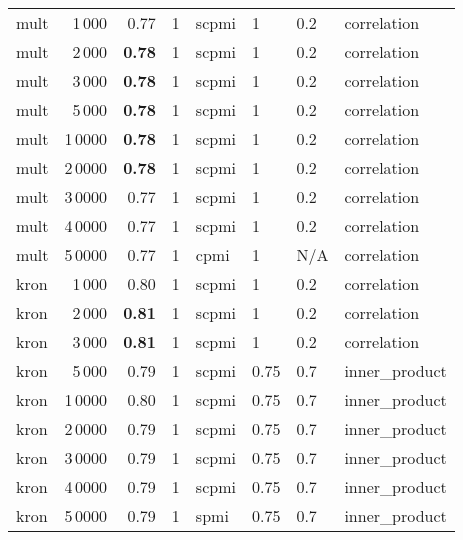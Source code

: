 \begin{tabular}{lrrlllll}
    mult &            1\,000 &  0.77 &     1 &  scpmi &       1 &  0.2 &    correlation \\
    mult &            2\,000 &  \textbf{0.78} &     1 &  scpmi &       1 &  0.2 &    correlation \\
    mult &            3\,000 &  \textbf{0.78} &     1 &  scpmi &       1 &  0.2 &    correlation \\
    mult &            5\,000 &  \textbf{0.78} &     1 &  scpmi &       1 &  0.2 &    correlation \\
    mult &           1\,0000 & \textbf{ 0.78} &     1 &  scpmi &       1 &  0.2 &    correlation \\
    mult &           2\,0000 &  \textbf{0.78} &     1 &  scpmi &       1 &  0.2 &    correlation \\
    mult &           3\,0000 &  0.77 &     1 &  scpmi &       1 &  0.2 &    correlation \\
    mult &           4\,0000 &  0.77 &     1 &  scpmi &       1 &  0.2 &    correlation \\
    mult &           5\,0000 &  0.77 &     1 &   cpmi &       1 &  N/A &    correlation \\ \addlinespace
    kron &            1\,000 &  0.80 &     1 &  scpmi &       1 &  0.2 &    correlation \\
    kron &            2\,000 &  \textbf{0.81} &     1 &  scpmi &       1 &  0.2 &    correlation \\
    kron &            3\,000 &  \textbf{0.81} &     1 &  scpmi &       1 &  0.2 &    correlation \\
    kron &            5\,000 &  0.79 &     1 &  scpmi &    0.75 &  0.7 &  inner\_product \\
    kron &           1\,0000 &  0.80 &     1 &  scpmi &    0.75 &  0.7 &  inner\_product \\
    kron &           2\,0000 &  0.79 &     1 &  scpmi &    0.75 &  0.7 &  inner\_product \\
    kron &           3\,0000 &  0.79 &     1 &  scpmi &    0.75 &  0.7 &  inner\_product \\
    kron &           4\,0000 &  0.79 &     1 &  scpmi &    0.75 &  0.7 &  inner\_product \\
    kron &           5\,0000 &  0.79 &     1 &   spmi &    0.75 &  0.7 &  inner\_product \\
\bottomrule
\end{tabular}
